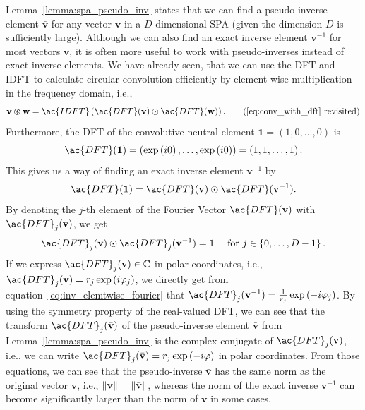 Lemma~\ref{lemma:spa_pseudo_inv} states that we can find a pseudo-inverse element $\bar{\mathbf{v}}$ for any vector $ \mathbf{v}$ in a $D$-dimensional \ac{SPA} (given the dimension $D$ is sufficiently large).
Although we can also find an exact inverse element $ \mathbf{v}^{-1}$ for most vectors $ \mathbf{v}$, it is often more useful to work with pseudo-inverses instead of exact inverse elements.
We have already seen, that we can use the \acf{DFT} and \acf{IDFT} to calculate circular convolution efficiently by element-wise multiplication  \parencite[this follows from the convolution theorem, see][Chap. 6]{Bracewell2000} in the frequency domain, i.e.,
\begin{equation}
    \mathbf{v} \varoast \mathbf{w} = \ac{IDFT}\left(\ac{DFT}( \mathbf{v}) \odot \ac{DFT}( \mathbf{w}) \right). \tag{\ref{eq:conv_with_dft} revisited}
\end{equation}
Furthermore, the \ac{DFT} of the convolutive neutral element $\mathbf{1} = \left(1, 0, \ldots, 0\right)$ is
\begin{equation}
	\ac{DFT}(\mathbf{1}) = \left(\exp\left(i0\right), \ldots, \exp\left(i0\right)\right) = \left(1, 1, \ldots, 1\right).
\end{equation}
This gives us a way of finding an exact inverse element $ \mathbf{v}^{-1}$ by
\begin{equation}
	\ac{DFT}(\mathbf{1}) = \ac{DFT}( \mathbf{v}) \odot \ac{DFT}( \mathbf{v}^{-1}).
\end{equation}
By denoting the $j$-th element of the Fourier Vector $\ac{DFT}( \mathbf{v})$ with $\ac{DFT}_{j}( \mathbf{v})$, we get
\begin{equation}
\label{eq:inv_elemtwise_fourier}
	\ac{DFT}_{j}( \mathbf{v}) \odot \ac{DFT}_{j}( \mathbf{v}^{-1}) = 1 \quad \textrm{ for } j \in \left\{0, \ldots, D-1\right\}.
\end{equation}
If we express $\ac{DFT}_{j}( \mathbf{v}) \in \mathbb{C}$ in polar coordinates, i.e., $\ac{DFT}_{j}( \mathbf{v}) = r_j \exp\left(i\varphi_j\right)$, we directly get from equation~\eqref{eq:inv_elemtwise_fourier} that $\ac{DFT}_{j}( \mathbf{v}^{-1}) = \frac{1}{r_j} \exp\left(-i\varphi_j\right)$.
By using the symmetry property of the real-valued \ac{DFT}, we can see that the transform $\ac{DFT}_j(\bar{\mathbf{v}})$ of the pseudo-inverse element $\bar{\mathbf{v}}$ from Lemma~\ref{lemma:spa_pseudo_inv} is the complex conjugate of $\ac{DFT}_j( \mathbf{v})$, i.e., we can write $\ac{DFT}_j(\bar{\mathbf{v}}) = r_j \exp\left(-i\varphi\right)$ in polar coordinates.
From those equations, we can see that the pseudo-inverse $\bar{\mathbf{v}}$ has the same norm as the original vector $ \mathbf{v}$, i.e., $\left\|  \mathbf{v} \right\| = \left\| \bar{\mathbf{v}} \right\|$, whereas the norm of the exact inverse $ \mathbf{v}^{-1}$ can become significantly larger than the norm of $ \mathbf{v}$ in some cases.
